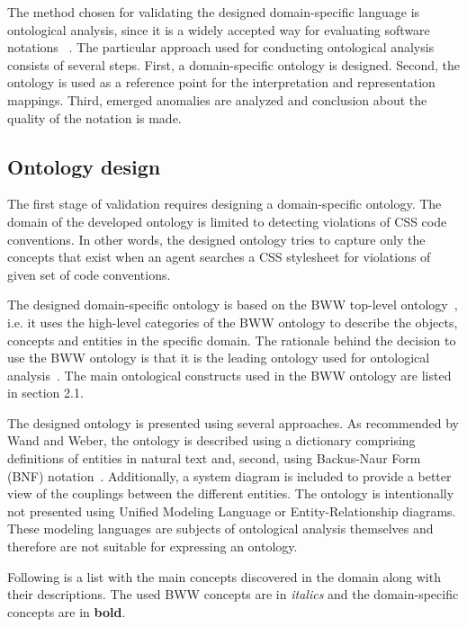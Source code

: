 The method chosen for validating the designed domain-specific language is
ontological analysis, since it is a widely accepted way for evaluating
software notations
~\cite{opdahl2002ontological,green2000integrated,moody2009physics,parsons1997using,weber1996analytical}.
The particular approach used for conducting ontological analysis consists of
several steps. First, a domain-specific ontology is designed. Second, the
ontology is used as a reference point for the interpretation and
representation mappings. Third, emerged anomalies are analyzed and conclusion
about the quality of the notation is made.

\subsection{Ontology design}

The first stage of validation requires designing a domain-specific ontology. The domain of the
developed ontology is limited to detecting violations of CSS code conventions. In other words, the
designed ontology tries to capture only the concepts that exist when an agent searches a CSS stylesheet
for violations of given set of code conventions.

The designed domain-specific ontology is based on the BWW top-level
ontology~\cite{wand1990ontological}, i.e. it uses the high-level categories of
the BWW ontology to describe the objects, concepts and entities in the
specific domain. The rationale behind the decision to use the BWW ontology is that
it is the leading ontology used for ontological
analysis~\cite{moody2009physics}. The main ontological constructs used in the
BWW ontology are listed in section 2.1.

The designed ontology is presented using several approaches. As recommended by
Wand and Weber, the ontology is described using a dictionary comprising
definitions of entities in natural text and, second, using Backus-Naur Form
(BNF) notation~\cite{wand1995deep,rosemann2002developing}. Additionally, a
system diagram is included to provide a better view of the couplings between
the different entities. The ontology is intentionally not presented using
Unified Modeling Language or Entity-Relationship diagrams. These modeling
languages are subjects of ontological analysis themselves and therefore are
not suitable for expressing an ontology.

Following is a list with the main concepts discovered in the domain along with
their descriptions. The used BWW concepts are in \textit{italics} and
the domain-specific concepts are in \textbf{bold}.

